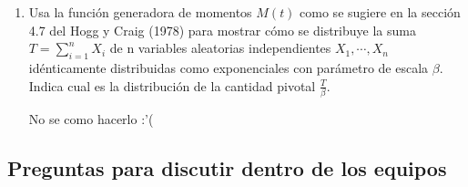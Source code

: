 \documentclass[letterpaper]{article}
\theoremstyle{definition}
\theoremstyle{lemathm}
\theoremstyle{lemathm}
\theoremstyle{lemathm}
\theoremstyle{lemademthm}
\newcommand{\pars}[1]{\left( #1 \right) }
\newcommand{\1}{\mathbbm{1}}
\begin{document}
\begin{enumerate}
\begin{proof}
			puesto que la función Beta es simétrica tenemos que

			\[f_Y(y) = \frac{1}{B\pars{\frac{b}{2},\frac{a}{2}}} \pars{\frac{a}{b}}^{\frac{a}{2}-1} \pars{\frac{1}{y}}^{\frac{a}{2}-1} \pars{1+\frac{a}{b}\pars{\frac{1}{y}}}^{-\frac{a+b}{2}} \frac{1}{y^2},\]

			factorizando y haciendo uso de las leyes de exponentes obtenemos

			\[f_Y(y) = \frac{1}{B\pars{\frac{b}{2},\frac{a}{2}}} \pars{\frac{b}{a}y}^{\frac{a}{2}} \pars{1+\frac{b}{a}y}^{-\frac{a+b}{2}} \frac{1}{y},\]

			por lo tanto

			\[f_Y(y) = \frac{1}{B\pars{\frac{b}{2},\frac{a}{2}}} \pars{\frac{b}{a}}^{\frac{a}{2}} y^{\frac{a}{2}-1} \pars{1+\frac{b}{a}y}^{-\frac{a+b}{2}},\]

			la cual es la función de densidad de una $F$ de Fisher con sus grados de libertad $(b,a)$, por lo tanto concluimos que $Y$ se distribuye como $F$ de Fisher con grados de libertad $(b,a)$.

		\end{proof}

		\item Usa la función generadora de momentos $M(t)$ como se sugiere en la sección 4.7 del Hogg y Craig (1978) para mostrar cómo se distribuye la suma $T = \sum_{i = 1}^n X_i$ de n variables aleatorias independientes $X_1,\cdots,X_n$ idénticamente distribuidas como exponenciales con parámetro de escala $\beta$. Indica cual es la distribución de la cantidad pivotal $\frac{T}{\beta}$.
		
		No se como hacerlo :'(
		
	\end{enumerate}

	\subsection*{Preguntas para discutir dentro de los equipos}
\end{document}
